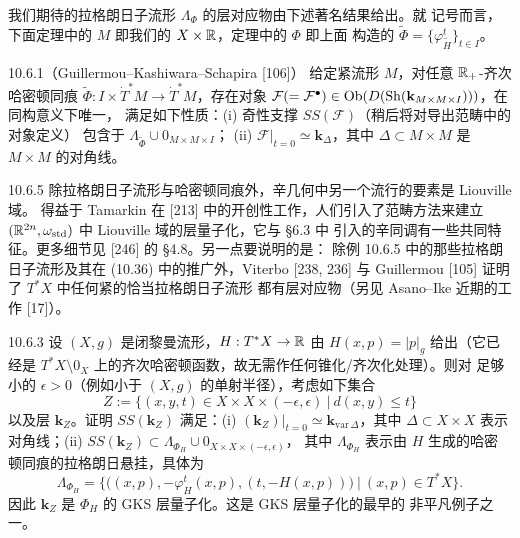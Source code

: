 我们期待的拉格朗日子流形 $\Lambda_{\Phi}$ 的层对应物由下述著名结果给出。就
记号而言，下面定理中的 $M$ 即我们的 $X\times\mathbb{R}$，定理中的 $\Phi$ 即上面
构造的 $\widetilde\Phi=\{\varphi^t_{\widetilde H}\}_{t\in I}$。

\begin{wthm}{10.6.1}（Guillermou–Kashiwara–Schapira [106]）
给定紧流形 $M$，对任意 $\mathbb{R}_+$-齐次哈密顿同痕
$\widetilde\Phi:I\times\dot T^*M\to\dot T^*M$，存在对象
$\mathcal F(=\mathcal F^{\bullet})
\in\operatorname{Ob}(D(\operatorname{Sh}(\mathbf{k}_{M\times M\times I})))$，在同构意义下唯一，
满足如下性质：(i) 奇性支撑 $SS(\mathcal F)$（稍后将对导出范畴中的对象定义）
包含于 $\Lambda_{\widetilde\Phi}\cup0_{M\times M\times I}$；
(ii) $\mathcal F|_{t=0}\simeq\mathbf{k}_{\Delta}$，其中
$\Delta\subset M\times M$ 是 $M\times M$ 的对角线。
\end{wthm}


\begin{wrem}{10.6.5}
除拉格朗日子流形与哈密顿同痕外，辛几何中另一个流行的要素是 Liouville 域。
得益于 Tamarkin 在 [213] 中的开创性工作，人们引入了范畴方法来建立
$(\mathbb{R}^{2n},\omega_{\mathrm{std}})$ 中 Liouville 域的层量子化，它与 §6.3 中
引入的辛同调有一些共同特征。更多细节见 [246] 的 §4.8。另一点要说明的是：
除例 10.6.5 中的那些拉格朗日子流形及其在 (10.36) 中的推广外，Viterbo
[238, 236] 与 Guillermou [105] 证明了 $T^*X$ 中任何紧的恰当拉格朗日子流形
都有层对应物（另见 Asano–Ike 近期的工作 [17]）。
\end{wrem}

\begin{wexer}{10.6.3}
设 $(X,g)$ 是闭黎曼流形，$H:T^*X\to\mathbb{R}$ 由 $H(x,p)=|p|_g$ 给出（它已经是
$T^*X\setminus0_X$ 上的齐次哈密顿函数，故无需作任何锥化/齐次化处理）。则对
足够小的 $\epsilon>0$（例如小于 $(X,g)$ 的单射半径），考虑如下集合
\[
  Z:=\bigl\{(x,y,t)\in X\times X\times(-\epsilon,\epsilon)
  \ \big|\ d(x,y)\le t\bigr\}
\]
以及层 $\mathbf{k}_Z$。证明 $SS(\mathbf{k}_Z)$ 满足：(i)
$(\mathbf{k}_Z)|_{t=0}\simeq\mathbf{k}_{\mathrm{var}\,\Delta}$，其中
$\Delta\subset X\times X$ 表示对角线；(ii)
$SS(\mathbf{k}_Z)\subset\Lambda_{\Phi_H}\cup0_{X\times X\times(-\epsilon,\epsilon)}$，
其中 $\Lambda_{\Phi_H}$ 表示由 $H$ 生成的哈密顿同痕的拉格朗日悬挂，具体为
\[
  \Lambda_{\Phi_H}
  =\bigl\{\bigl((x,p),-\varphi^t_H(x,p),(t,-H(x,p))\bigr)
  \ \big|\ (x,p)\in T^*X\bigr\}.
\]
因此 $\mathbf{k}_Z$ 是 $\Phi_H$ 的 GKS 层量子化。这是 GKS 层量子化的最早的
非平凡例子之一。
\end{wexer}
